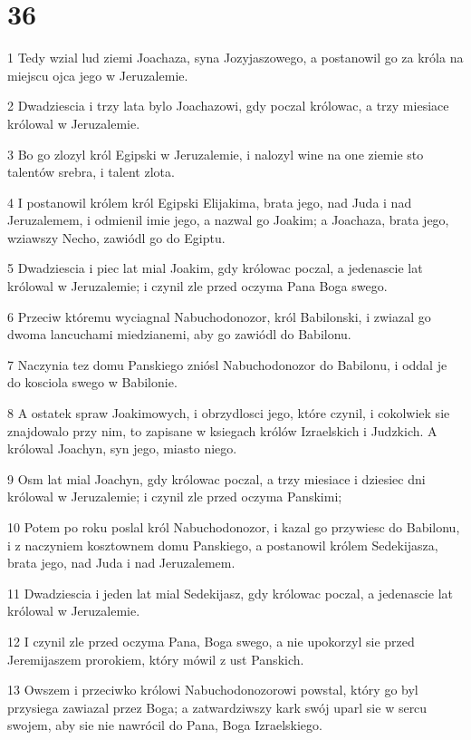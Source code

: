\chapter{36}

\par 1 Tedy wzial lud ziemi Joachaza, syna Jozyjaszowego, a postanowil go za króla na miejscu ojca jego w Jeruzalemie.
\par 2 Dwadziescia i trzy lata bylo Joachazowi, gdy poczal królowac, a trzy miesiace królowal w Jeruzalemie.
\par 3 Bo go zlozyl król Egipski w Jeruzalemie, i nalozyl wine na one ziemie sto talentów srebra, i talent zlota.
\par 4 I postanowil królem król Egipski Elijakima, brata jego, nad Juda i nad Jeruzalemem, i odmienil imie jego, a nazwal go Joakim; a Joachaza, brata jego, wziawszy Necho, zawiódl go do Egiptu.
\par 5 Dwadziescia i piec lat mial Joakim, gdy królowac poczal, a jedenascie lat królowal w Jeruzalemie; i czynil zle przed oczyma Pana Boga swego.
\par 6 Przeciw któremu wyciagnal Nabuchodonozor, król Babilonski, i zwiazal go dwoma lancuchami miedzianemi, aby go zawiódl do Babilonu.
\par 7 Naczynia tez domu Panskiego zniósl Nabuchodonozor do Babilonu, i oddal je do kosciola swego w Babilonie.
\par 8 A ostatek spraw Joakimowych, i obrzydlosci jego, które czynil, i cokolwiek sie znajdowalo przy nim, to zapisane w ksiegach królów Izraelskich i Judzkich. A królowal Joachyn, syn jego, miasto niego.
\par 9 Osm lat mial Joachyn, gdy królowac poczal, a trzy miesiace i dziesiec dni królowal w Jeruzalemie; i czynil zle przed oczyma Panskimi;
\par 10 Potem po roku poslal król Nabuchodonozor, i kazal go przywiesc do Babilonu, i z naczyniem kosztownem domu Panskiego, a postanowil królem Sedekijasza, brata jego, nad Juda i nad Jeruzalemem.
\par 11 Dwadziescia i jeden lat mial Sedekijasz, gdy królowac poczal, a jedenascie lat królowal w Jeruzalemie.
\par 12 I czynil zle przed oczyma Pana, Boga swego, a nie upokorzyl sie przed Jeremijaszem prorokiem, który mówil z ust Panskich.
\par 13 Owszem i przeciwko królowi Nabuchodonozorowi powstal, który go byl przysiega zawiazal przez Boga; a zatwardziwszy kark swój uparl sie w sercu swojem, aby sie nie nawrócil do Pana, Boga Izraelskiego.
